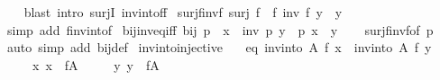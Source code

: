 \begin{isabellebody}
%
\isadelimproof
\ \ %
\endisadelimproof
%
\isatagproof
{}\isamarkupfalse%
\ {\isacharparenleft}{\kern0pt}blast\ intro{\isacharbang}{\kern0pt}{\isacharcolon}{\kern0pt}\ surjI\ inv{\isacharunderscore}{\kern0pt}into{\isacharunderscore}{\kern0pt}f{\isacharunderscore}{\kern0pt}f{\isacharparenright}{\kern0pt}%
\endisatagproof
{\isafoldproof}%
%
\isadelimproof
\isanewline
%
\endisadelimproof
\isanewline
{}\isamarkupfalse%
\ surj{\isacharunderscore}{\kern0pt}f{\isacharunderscore}{\kern0pt}inv{\isacharunderscore}{\kern0pt}f{\isacharcolon}{\kern0pt}\ {\isachardoublequoteopen}surj\ f\ {\isasymLongrightarrow}\ f\ {\isacharparenleft}{\kern0pt}inv\ f\ y{\isacharparenright}{\kern0pt}\ {\isacharequal}{\kern0pt}\ y{\isachardoublequoteclose}\isanewline
%
\isadelimproof
\ \ %
\endisadelimproof
%
\isatagproof
{}\isamarkupfalse%
\ {\isacharparenleft}{\kern0pt}simp\ add{\isacharcolon}{\kern0pt}\ f{\isacharunderscore}{\kern0pt}inv{\isacharunderscore}{\kern0pt}into{\isacharunderscore}{\kern0pt}f{\isacharparenright}{\kern0pt}%
\endisatagproof
{\isafoldproof}%
%
\isadelimproof
\isanewline
%
\endisadelimproof
\isanewline
{}\isamarkupfalse%
\ bij{\isacharunderscore}{\kern0pt}inv{\isacharunderscore}{\kern0pt}eq{\isacharunderscore}{\kern0pt}iff{\isacharcolon}{\kern0pt}\ {\isachardoublequoteopen}bij\ p\ {\isasymLongrightarrow}\ x\ {\isacharequal}{\kern0pt}\ inv\ p\ y\ {\isasymlongleftrightarrow}\ p\ x\ {\isacharequal}{\kern0pt}\ y{\isachardoublequoteclose}\isanewline
%
\isadelimproof
\ \ %
\endisadelimproof
%
\isatagproof
{}\isamarkupfalse%
\ surj{\isacharunderscore}{\kern0pt}f{\isacharunderscore}{\kern0pt}inv{\isacharunderscore}{\kern0pt}f{\isacharbrackleft}{\kern0pt}of\ p{\isacharbrackright}{\kern0pt}\ \isamarkupfalse%
\ {\isacharparenleft}{\kern0pt}auto\ simp\ add{\isacharcolon}{\kern0pt}\ bij{\isacharunderscore}{\kern0pt}def{\isacharparenright}{\kern0pt}%
\endisatagproof
{\isafoldproof}%
%
\isadelimproof
\isanewline
%
\endisadelimproof
\isanewline
{}\isamarkupfalse%
\ inv{\isacharunderscore}{\kern0pt}into{\isacharunderscore}{\kern0pt}injective{\isacharcolon}{\kern0pt}\isanewline
\ \ \ eq{\isacharcolon}{\kern0pt}\ {\isachardoublequoteopen}inv{\isacharunderscore}{\kern0pt}into\ A\ f\ x\ {\isacharequal}{\kern0pt}\ inv{\isacharunderscore}{\kern0pt}into\ A\ f\ y{\isachardoublequoteclose}\isanewline
\ \ \ \ \ x{\isacharcolon}{\kern0pt}\ {\isachardoublequoteopen}x\ {\isasymin}\ f{\isacharbackquote}{\kern0pt}A{\isachardoublequoteclose}\isanewline
\ \ \ \ \ y{\isacharcolon}{\kern0pt}\ {\isachardoublequoteopen}y\ {\isasymin}\ f{\isacharbackquote}{\kern0pt}A{\isachardoublequoteclose}\isanewline

\end{isabellebody}
